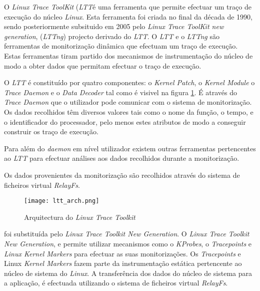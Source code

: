 
O \textit{Linux Trace ToolKit} (\textit{LTT}é uma ferramenta que permite efectuar um traço de execução do núcleo \textit{Linux}.
Esta ferramenta foi criada no final da década de 1990, sendo posteriormente subsituido em 2005 pelo \textit{Linux Trace ToolKit new generation}, (\textit{LTTng}) projecto derivado do \textit{LTT}.
O \textit{LTT} e o \textit{LTTng} são ferramentas de monitorização dinâmica que efectuam um traço de execução.
Estas ferramentas tiram partido dos mecanismos de instrumentação do núcleo de modo a obter dados que permitam efectuar o traço de execução.

O \textit{LTT} é constituído por quatro componentes: o \textit{Kernel Patch}, o \textit{Kernel Module} o \textit{Trace Daemon} e o \textit{Data Decoder} tal como é visivel na figura \ref{fig:ltt_arch}.
É através do \textit{Trace Daemon} que o utilizador pode comunicar com o sistema de monitorização.
Os dados recolhidos têm diversos valores tais como o nome da função, o tempo, e o identificador do processador, pelo menos estes atributos de modo a conseguir construir os traço de execução.


Para além do \textit{daemon} em nível utilizador existem outras ferramentas pertencentes ao \textit{LTT} para efectuar análises aos dados recolhidos durante a monitorização.


Os dados provenientes da monitorização são recolhidos através do sistema de ficheiros virtual \textit{RelayFs}.

\begin{figure}[!htb]
       \centering
       \texttt{[image: ltt\_arch.png]}
       \caption{Arquitectura do \textit{Linux Trace Toolkit} \cite{Yaghmour:2000:MCS:1267724.1267726}}
	\label{fig:ltt_arch}
\end{figure}

\cite{Yaghmour:2000:MCS:1267724.1267726}
foi substituída pelo \textit{Linux Trace Toolkit New Generation}.
O \textit{Linux Trace Toolkit New Generation}, e permite utilizar mecanismos como o \textit{KProbes}, o \textit{Tracepoints}\cite{Mathieu2009} e \textit{Linux Kernel Markers}\cite{Mathieu2009} para efectuar as suas monitorizações.
Os \textit{Tracepoints} e Linux \textit{Kernel Markers} fazem parte da instrumentação estática pertencente ao núcleo de sistema do \textit{Linux}.
A transferência dos dados do núcleo de sistema para a aplicação, é efectuada utilizando o sistema de ficheiros virtual \textit{RelayFs}.

